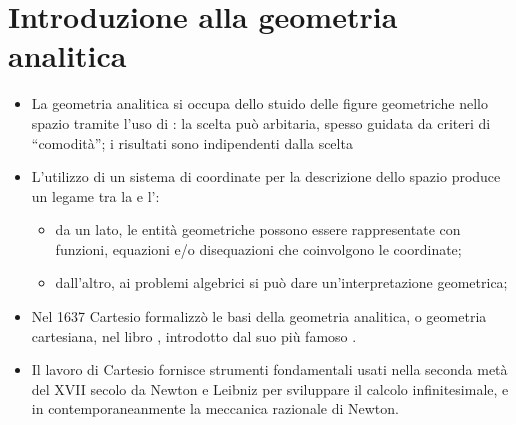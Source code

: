 \documentclass[letterpaper,10pt,english]{jupyterBook}
\begin{document}
\chapter{Introduzione alla geometria analitica}
\label{\detokenize{ch/analytic_geometry:introduzione-alla-geometria-analitica}}\label{\detokenize{ch/analytic_geometry:geometry-analytic}}\label{\detokenize{ch/analytic_geometry::doc}}\begin{itemize}
\item {} 
\sphinxAtStartPar
La geometria analitica si occupa dello stuido delle figure geometriche nello spazio tramite l’uso di : la scelta può arbitaria, spesso guidata da criteri di “comodità”; i risultati sono indipendenti dalla scelta

\item {} 
\sphinxAtStartPar
L’utilizzo di un sistema di coordinate per la descrizione dello spazio produce un legame tra la  e l’:
\begin{itemize}
\item {} 
\sphinxAtStartPar
da un lato, le entità geometriche possono essere rappresentate con funzioni, equazioni e/o disequazioni che coinvolgono le coordinate;

\item {} 
\sphinxAtStartPar
dall’altro, ai problemi algebrici si può dare un’interpretazione geometrica;

\end{itemize}

\item {} 
\sphinxAtStartPar
Nel 1637 Cartesio formalizzò le basi della geometria analitica, o geometria cartesiana, nel libro , introdotto dal suo più famoso .

\item {} 
\sphinxAtStartPar
Il lavoro di Cartesio fornisce strumenti fondamentali usati nella seconda metà del XVII secolo da Newton e Leibniz per sviluppare il calcolo infinitesimale, e in contemporaneanmente la meccanica razionale di Newton.

\end{itemize}
\end{document}
